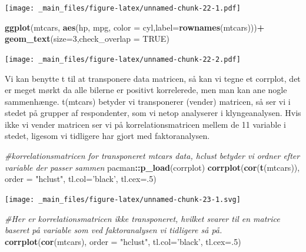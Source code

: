 \documentclass[]{book}
\newenvironment{Shaded}{\begin{snugshade}}{\end{snugshade}}
\newcommand{\CommentTok}[1]{\textcolor[rgb]{0.56,0.35,0.01}{\textit{#1}}}
\newcommand{\DataTypeTok}[1]{\textcolor[rgb]{0.13,0.29,0.53}{#1}}
\newcommand{\DecValTok}[1]{\textcolor[rgb]{0.00,0.00,0.81}{#1}}
\newcommand{\KeywordTok}[1]{\textcolor[rgb]{0.13,0.29,0.53}{\textbf{#1}}}
\newcommand{\NormalTok}[1]{#1}
\newcommand{\OperatorTok}[1]{\textcolor[rgb]{0.81,0.36,0.00}{\textbf{#1}}}
\newcommand{\OtherTok}[1]{\textcolor[rgb]{0.56,0.35,0.01}{#1}}
\newcommand{\StringTok}[1]{\textcolor[rgb]{0.31,0.60,0.02}{#1}}
\begin{document}
\texttt{[image: \_main\_files/figure-latex/unnamed-chunk-22-1.pdf]}

\begin{Shaded}
\begin{Highlighting}[]
\KeywordTok{ggplot}\NormalTok{(mtcars, }\KeywordTok{aes}\NormalTok{(hp, mpg, }\DataTypeTok{color =}\NormalTok{ cyl,}\DataTypeTok{label=}\KeywordTok{rownames}\NormalTok{(mtcars)))}\OperatorTok{+}
\StringTok{  }\KeywordTok{geom_text}\NormalTok{(}\DataTypeTok{size=}\DecValTok{3}\NormalTok{,}\DataTypeTok{check_overlap =} \OtherTok{TRUE}\NormalTok{)}
\end{Highlighting}
\end{Shaded}

\texttt{[image: \_main\_files/figure-latex/unnamed-chunk-22-2.pdf]}

Vi kan benytte t til at transponere data matricen, så kan vi tegne et corrplot, det er meget mørkt da alle bilerne er positivt korrelerede, men man kan ane nogle sammenhænge. t(mtcars) betyder vi transponerer (vender) matricen, så ser vi i stedet på grupper af respondenter, som vi netop analyserer i klyngeanalysen. Hvis ikke vi vender matricen ser vi på korrelationsmatricen mellem de 11 variable i stedet, ligesom vi tidligere har gjort med faktoranalysen.

\begin{Shaded}
\begin{Highlighting}[]
\CommentTok{#korrelationsmatricen for transponeret mtcars data, hclust betyder vi ordner efter variable der passer sammen}
\NormalTok{pacman}\OperatorTok{::}\KeywordTok{p_load}\NormalTok{(corrplot)}
\KeywordTok{corrplot}\NormalTok{(}\KeywordTok{cor}\NormalTok{(}\KeywordTok{t}\NormalTok{(mtcars)), }\DataTypeTok{order =} \StringTok{"hclust"}\NormalTok{, }\DataTypeTok{tl.col=}\StringTok{'black'}\NormalTok{, }\DataTypeTok{tl.cex=}\NormalTok{.}\DecValTok{5}\NormalTok{)}
\end{Highlighting}
\end{Shaded}

\texttt{[image: \_main\_files/figure-latex/unnamed-chunk-23-1.svg]}

\begin{Shaded}
\begin{Highlighting}[]
\CommentTok{#Her er korrelationsmatricen ikke transponeret, hvilket svarer til en matrice baseret på variable som ved faktoranalysen vi tidligere så på.}
\KeywordTok{corrplot}\NormalTok{(}\KeywordTok{cor}\NormalTok{(mtcars), }\DataTypeTok{order =} \StringTok{"hclust"}\NormalTok{, }\DataTypeTok{tl.col=}\StringTok{'black'}\NormalTok{, }\DataTypeTok{tl.cex=}\NormalTok{.}\DecValTok{5}\NormalTok{)}
\end{Highlighting}
\end{Shaded}
\end{document}
